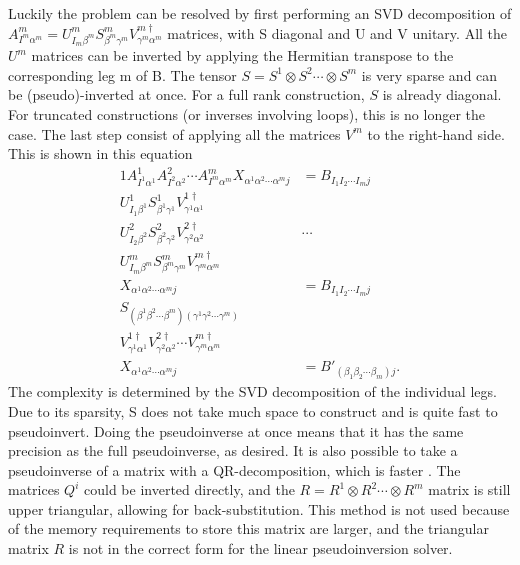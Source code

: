 Luckily the problem can be resolved by first performing an \Gls{SVD} decomposition of $A^m_{ I^m \alpha^m } = U^m_{ I_m \beta^m } S^m_{\beta^m \gamma^m}  V^{m\dagger}_{\gamma^m \alpha^m}$ matrices, with S diagonal and U and V unitary. All the $U^m$ matrices can be inverted by applying the Hermitian transpose to the corresponding leg m of B. The tensor $S = S^1 \otimes S^2 \cdots \otimes S^m$ is very sparse and can be (pseudo)-inverted at once. For a full rank construction, $S$  is already diagonal. For truncated constructions (or inverses involving loops), this is no longer the case.
The last step consist of applying all the matrices $V^m$ to the right-hand side. This is shown in this equation
\begin{alignat}{1}
    A^1_{ I^1 \alpha^1 }   A^2_{ I^2 \alpha^2 }  \cdots  A^m_{ I^m \alpha^m }   X_{ \alpha^1  \alpha^2  \cdots \alpha^m j } & =  B_{  I_1  I_2 \cdots I_m   j }                 \\%
    U^1_{ I_1 \beta^1 } S^1_{\beta^1 \gamma^1}  V^{1\dagger}_{\gamma^1 \alpha^1}                                            & \nonumber                                         \\
    U^2_{ I_2 \beta^2 } S^2_{\beta^2 \gamma^2}  V^{2\dagger}_{\gamma^2 \alpha^2}                                            & \cdots  \nonumber                                 \\
    U^m_{ I_m \beta^m } S^m_{\beta^m \gamma^m}  V^{m\dagger}_{\gamma^m \alpha^m}                                            & \nonumber                                         \\
    X_{ \alpha^1  \alpha^2  \cdots \alpha^m j }                                                                             & =  B_{  I_1  I_2 \cdots I_m   j }                 \\ %
    S_{ (\beta^1 \beta^2 \cdots \beta^m) (\gamma^1  \gamma^2 \cdots \gamma^m)  }                                            & \nonumber                                         \\
    V^{1\dagger}_{\gamma^1 \alpha^1}   V^{2\dagger}_{\gamma^2 \alpha^2}  \cdots  V^{m\dagger}_{\gamma^m \alpha^m}           & \nonumber                                         \\
    X_{ \alpha^1  \alpha^2  \cdots \alpha^m j }                                                                             & =  B'_{  (\beta_1  \beta_2 \cdots \beta_m )  j }.
\end{alignat}
The complexity is determined by the \Gls{SVD} decomposition of the individual legs. Due to its sparsity, S does not take much space to construct and is quite fast to pseudoinvert. Doing the pseudoinverse at once means that it has the same precision as the full pseudoinverse, as desired.  It is also possible to take a pseudoinverse of a matrix with a QR-decomposition, which is faster \cite{Moylan2016}. The matrices $Q^i$ could be inverted directly, and the $R = R^1 \otimes R^2 \cdots \otimes R^m$  matrix is still upper triangular, allowing for back-substitution. This method is not used because of the memory requirements to store this matrix are larger, and the triangular matrix $R$ is not in the correct form for the linear pseudoinversion solver.

